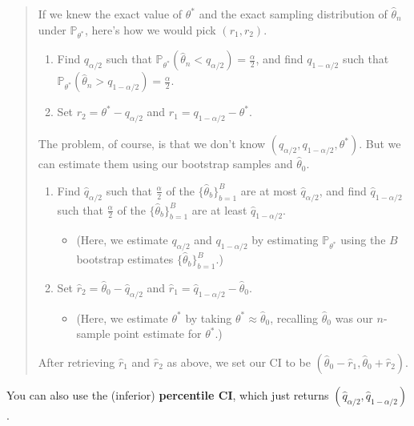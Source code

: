 \begin{quote}
    If we knew the exact value of $\theta^*$ and
    the exact sampling distribution of $\hat{\theta}_n$ under $\mathbb{P}_{\theta^*}$,
    here's how we would pick $(r_1, r_2)$.
    \begin{enumerate}
        \item Find $q_{\alpha/2}$ such that
        $\mathbb{P}_{\theta^*}(\hat{\theta}_n < q_{\alpha/2}) = \frac{\alpha}{2}$,
        and find $q_{1 - \alpha/2}$ such that
        $\mathbb{P}_{\theta^*}(\hat{\theta}_n > q_{1 - \alpha/2}) = \frac{\alpha}{2}$.
        \item Set $r_2 = \theta^* - q_{\alpha/2}$ and $r_1 = q_{1 - \alpha/2} - \theta^*$.
    \end{enumerate}
    The problem, of course, is that we don't know
    $(q_{\alpha/2}, q_{1 - \alpha/2}, \theta^*)$.
    But we can estimate them using our bootstrap samples and $\hat{\theta}_0$.
    \begin{enumerate}
        \item Find $\hat{q}_{\alpha/2}$ such that
        $\frac{\alpha}{2}$ of the $\{\hat{\theta}_b\}_{b = 1}^B$
        are at most $\hat{q}_{\alpha/2}$,
        and find $\hat{q}_{1 - \alpha/2}$ such that
        $\frac{\alpha}{2}$ of the $\{\hat{\theta}_b\}_{b = 1}^B$
        are at least $\hat{q}_{1 - \alpha/2}$.
        \begin{itemize}
            \item (Here, we estimate $q_{\alpha / 2}$ and $q_{1 - \alpha / 2}$
            by estimating $\mathbb{P}_{\theta^*}$ using
            the $B$ bootstrap estimates $\{\hat{\theta}_b\}_{b = 1}^B$.)
        \end{itemize}
        \item Set $\hat{r}_2 = \hat{\theta}_0 - \hat{q}_{\alpha/2}$ and
        $\hat{r}_1 = \hat{q}_{1 - \alpha/2} - \hat{\theta}_0$.
        \begin{itemize}
            \item (Here, we estimate $\theta^*$ by taking
            $\theta^* \approx \hat{\theta}_0$,
            recalling $\hat{\theta}_0$ was our
            $n$-sample point estimate for $\theta^*$.)
        \end{itemize}
    \end{enumerate}
    After retrieving $\hat{r}_1$ and $\hat{r}_2$ as above,
    we set our CI to be $(\hat{\theta}_0 - \hat{r}_1, \hat{\theta}_0 + \hat{r}_2)$.
\end{quote}

You can also use the (inferior) \textbf{percentile CI},
which just returns $(\hat{q}_{\alpha/2}, \hat{q}_{1 - \alpha/2})$.

